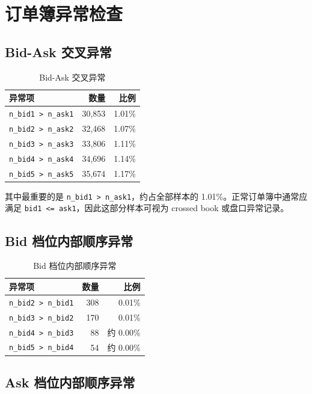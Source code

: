 \documentclass[UTF8,a4paper,12pt]{ctexart}
\begin{document}
\section{订单簿异常检查}

\subsection{Bid-Ask 交叉异常}

\begin{table}[H]
\centering
\caption{Bid-Ask 交叉异常}
\begin{tabular}{lrr}
\toprule
异常项 & 数量 & 比例 \\
\midrule
\texttt{n\_bid1 > n\_ask1} & 30,853 & 1.01\% \\
\texttt{n\_bid2 > n\_ask2} & 32,468 & 1.07\% \\
\texttt{n\_bid3 > n\_ask3} & 33,806 & 1.11\% \\
\texttt{n\_bid4 > n\_ask4} & 34,696 & 1.14\% \\
\texttt{n\_bid5 > n\_ask5} & 35,674 & 1.17\% \\
\bottomrule
\end{tabular}
\end{table}

其中最重要的是 \texttt{n\_bid1 > n\_ask1}，约占全部样本的 1.01\%。正常订单簿中通常应满足 \texttt{bid1 <= ask1}，因此这部分样本可视为 crossed book 或盘口异常记录。

\subsection{Bid 档位内部顺序异常}

\begin{table}[H]
\centering
\caption{Bid 档位内部顺序异常}
\begin{tabular}{lrr}
\toprule
异常项 & 数量 & 比例 \\
\midrule
\texttt{n\_bid2 > n\_bid1} & 308 & 0.01\% \\
\texttt{n\_bid3 > n\_bid2} & 170 & 0.01\% \\
\texttt{n\_bid4 > n\_bid3} & 88 & 约 0.00\% \\
\texttt{n\_bid5 > n\_bid4} & 54 & 约 0.00\% \\
\bottomrule
\end{tabular}
\end{table}

\subsection{Ask 档位内部顺序异常}
\end{document}

